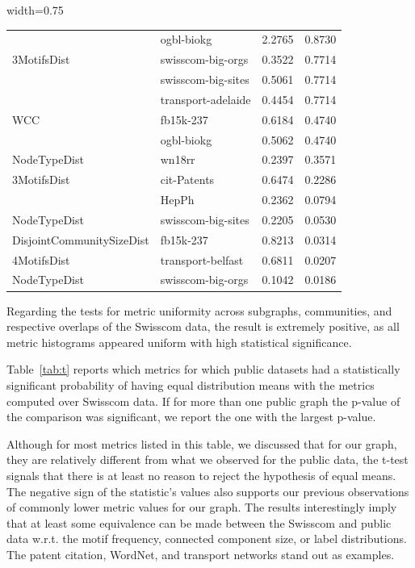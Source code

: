 \begin{table}[hb!]
\begin{adjustbox}{width=0.75\columnwidth}
\begin{tabular}{llrr}
             & ogbl-biokg &       2.2765 &        0.8730 \\
3MotifsDist & swisscom-big-orgs &       0.3522 &        0.7714 \\
             & swisscom-big-sites &       0.5061 &        0.7714 \\
             & transport-adelaide &       0.4454 &        0.7714 \\
WCC & fb15k-237 &       0.6184 &        0.4740 \\
             & ogbl-biokg &       0.5062 &        0.4740 \\
NodeTypeDist & wn18rr &       0.2397 &        0.3571 \\
3MotifsDist & cit-Patents &       0.6474 &        0.2286 \\
             & HepPh &       0.2362 &        0.0794 \\
NodeTypeDist & swisscom-big-sites &       0.2205 &        0.0530 \\
DisjointCommunitySizeDist & fb15k-237 &       0.8213 &        0.0314 \\
4MotifsDist & transport-belfast &       0.6811 &        0.0207 \\
NodeTypeDist & swisscom-big-orgs &       0.1042 &        0.0186 \\
\bottomrule
\end{tabular}
\end{adjustbox}
\end{table}

Regarding the tests for metric uniformity across subgraphs, communities, and respective overlaps of the Swisscom data, the result is extremely positive, as all metric histograms appeared uniform with high statistical significance. 

Table~\ref{tab:t} reports which metrics for which public datasets had a statistically significant probability of having equal distribution means with the metrics computed over Swisscom data. If for more than one public graph the p-value of the comparison was significant, we report the one with the largest p-value. 

Although for most metrics listed in this table, we discussed that for our graph, they are relatively different from what we observed for the public data, the t-test signals that there is at least no reason to reject the hypothesis of equal means. The negative sign of the statistic's values also supports our previous observations of commonly lower metric values for our graph. The results interestingly imply that at least some equivalence can be made between the Swisscom and public data w.r.t. the motif frequency, connected component size, or label distributions. The patent citation, WordNet, and transport networks stand out as examples.

